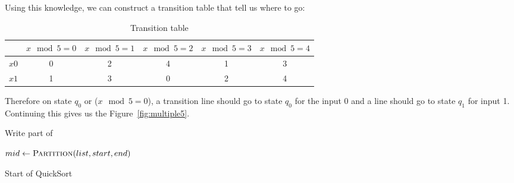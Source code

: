 \documentclass[]{mo-assignment}
\begin{document}
\begin{problem}
        Using this knowledge, we can construct a transition table that tell us
        where to go:

        \begin{table}[ht]
            \centering
                \begin{tabular}{c || c | c | c | c | c}
                    & \(x \mod 5 = 0\)
                    & \(x \mod 5 = 1\)
                    & \(x \mod 5 = 2\)
                    & \(x \mod 5 = 3\)
                    & \(x \mod 5 = 4\)
                    \\
                    \hline
                    \(x0\) & 0 & 2 & 4 & 1 & 3 \\
                    \(x1\) & 1 & 3 & 0 & 2 & 4 \\
                \end{tabular}
                \caption{Transition table}
        \end{table}

        Therefore on state \(q_0\) or (\(x \mod 5 = 0\)), a transition line should
        go to state \(q_0\) for the input 0 and a line should go to state \(q_1\)
        for input 1. Continuing this gives us the Figure~\ref{fig:multiple5}.
    \end{problem}

    \begin{problem}
        Write part of 

        \begin{algorithm}[]
            \begin{algorithmic}[1]
                        \State{} \Return{}
                    \EndIf{}
                    \State{} $mid \gets \Call{Partition}{list, start, end}$
                    \State{} 
                    \State{} 
                \EndFunction{}
            \end{algorithmic}
            \caption{Start of QuickSort}
        \end{algorithm}
    \end{problem}

    \pagebreak
\end{document}
